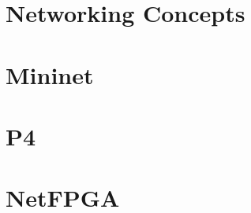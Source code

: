 \section{Networking Concepts}
\label{networking_concepts_research}


\section{Mininet}
\label{mininet}


\section{P4}
\label{p4}


\section{NetFPGA}
\label{netfpga}

